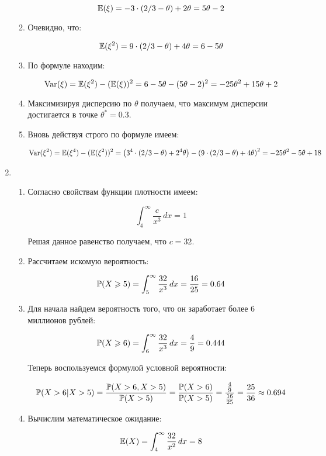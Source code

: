 \begin{enumerate}
\begin{enumerate}
		\[
		\E(\xi)=-3\cdot (2/3-\theta)+2\theta=5\theta-2
		\]
		
		\item Очевидно, что:
		
		\[
		\E(\xi^2)=9\cdot (2/3-\theta)+4\theta=6-5\theta
		\]
		
		\item По формуле находим:
		
		\[
		\Var(\xi)=\E(\xi^2)-(\E(\xi))^2=6-5\theta-(5\theta-2)^2=-25\theta^2+15\theta+2
		\]
		
		\item Максимизируя дисперсию по $\theta$ получаем, что максимум дисперсии достигается в точке $\theta^*=0.3$.
		
		\item Вновь действуя строго по формуле имеем:
		
		\[
		\Var(\xi^2)=\E(\xi^4)-(\E(\xi^2))^2=\left(3^{4}\cdot (2/3-\theta)+2^{4}\theta\right)-\left(9\cdot (2/3-\theta)+4\theta\right)^2=-25\theta^2-5\theta+18
		\]
		
	\end{enumerate}
	
	\item 
	\begin{enumerate}
		\item Согласно свойствам функции плотности имеем:
		
		\[
		\int_{4}^{\infty} \frac{c}{x^3}\, dx=1
		\]
		
		Решая данное равенство получаем, что $c=32$.
		
		\item Рассчитаем искомую вероятность:
		
		\[
		\P(X\geq5)=\int_{5}^{\infty} \frac{32}{x^3} \, dx=\frac{16}{25}=0.64
		\]
		
		\item Для начала найдем вероятность того, что он заработает более $6$ миллионов рублей:
		
		\[
		\P(X\geq6)=\int_{6}^{\infty} \frac{32}{x^3} \, dx=\frac{4}{9}=0.444
		\]
		
		Теперь воспользуемся формулой условной вероятности:
	
	\[
	\P(X>6|X>5)=\frac{\P(X>6, X>5)}{\P(X>5)}=\frac{\P(X>6)}{\P(X>5)}=\frac{\frac{4}{9}}{\frac{16}{25}}=\frac{25}{36}\approx0.694
	\]
	
	\item Вычислим математическое ожидание:
	
	\[
	\E(X)=\int_{4}^{\infty} \frac{32}{x^2} \, dx=8
	\]
	

\end{enumerate}
\end{enumerate}
